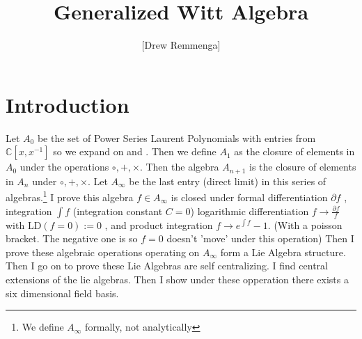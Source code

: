 \documentclass[10pt, oneside]{article}
\title{Generalized Witt Algebra}
\author{[Drew Remmenga]}
\newcommand{\C}{\mathbb{C}}
\begin{document}
\nocite{*}

\maketitle
\begin{abstract}
   
\end{abstract}
\section{Introduction}
   Let $A_0$ be the set of Power Series Laurent Polynomials with entries from $\C[x,x^{-1}]$ so we expand on \cite{pakianathan2010generalizedwittalgebrasvariable} and \cite{Kac1974}. Then we define $A_1$ as the closure of elements in $A_0$ under the operations $\circ,+,\times$. Then the algebra $A_{n+1}$ is the closure of elements in $A_n$ under $\circ, +, \times$.
   Let $A_\infty$ be the last entry (direct limit) in this series of algebras.\footnote{We define $A_{\infty}$ formally, not analytically} 
   I prove this algebra $f \in A_\infty$ is closed under formal differentiation $\partial f$ \cite{Dokovic1998}, integration $\int f$ (integration constant $C=0$)
   logarithmic differentiation $f \to \frac{\partial f}{f}$ with $\text{LD}(f=0):=0$ \cite{pakianathan2010generalizedwittalgebrasvariable}, and product integration $f \to e^{\int f} - 1$. (With a poisson bracket. The negative one is so $f=0$ doesn't 'move' under this operation) 
   Then I prove these algebraic operations operating on $A_\infty$ form a Lie Algebra structure. 
   Then I go on to prove these Lie Algebras are self centralizing. I find central extensions of the lie algebras. Then I show under these opperation there exists a six dimensional field basis. 
\end{document}
